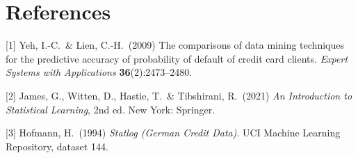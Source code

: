 \documentclass{article}
\begin{document}
\section*{References}

\small
[1] Yeh, I.-C.\ \& Lien, C.-H.\ (2009) The comparisons of data mining techniques
for the predictive accuracy of probability of default of credit card clients.
{\it Expert Systems with Applications} {\bf 36}(2):2473--2480.

[2] James, G., Witten, D., Hastie, T.\ \& Tibshirani, R.\ (2021) {\it An
Introduction to Statistical Learning}, 2nd ed. New York: Springer.

[3] Hofmann, H.\ (1994) {\it Statlog (German Credit Data)}. UCI Machine Learning
Repository, dataset 144.
\end{document}
